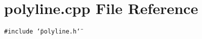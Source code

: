 \section{polyline.cpp File Reference}
\label{polyline_8cpp}
{\tt \#include \char`\"{}polyline.h\char`\"{}}\par
